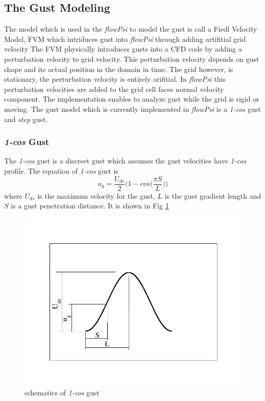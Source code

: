 \subsection{The Gust Modeling}

The model which is used in the \emph{flowPsi} to model the gust is call a 
Fiedl Velocity Model, FVM which intriduces gust into \emph{flowPsi} through adding 
artifitial grid velocity
The FVM physically introduces gusts into a CFD code by adding a perturbation velocity\cite{Parameswaran,Singh}
to grid velocity. This perturbation velocity depends on gust shape and its actual position in the domain
in time. The grid however, is stationary, the perturbation velocity is entirely arifitial.  
In \emph{flowPsi} this perturbation velocities are added to the grid cell faces normal velocity component.
The implementation enables to analyze gust while the grid is rigid or moving.  
The gust model which is currently implemented in \emph{flowPsi} is a \emph{1-cos} gust and 
\emph{step} gust.

\subsubsection{\emph{1-cos} Gust}
The \emph{1-cos} gust is a discreet gust which assumes the gust velocities have \emph{1-cos} profile\cite{USDT}.
The equation of  \emph{1-cos} gust is 
\begin{equation}
u_g = \frac{U_{ds}}{2}\Bigg(1-cos\Big(\frac{\pi S}{L}\Big)\Bigg)
\end{equation}
where $U_{ds}$ is the maximum velocity for the gust, $L$ is the gust gradient length 
and $S$ is a gust penetration distance. It is shown in Fig \ref{1-cosgust}
\begin{figure}[htbp]
  \centering\includegraphics[clip,width=.5\textwidth]{Figures/gust.jpg}
\caption{schematics of \emph{1-cos} gust}\label{1-cosgust}
\end{figure}

